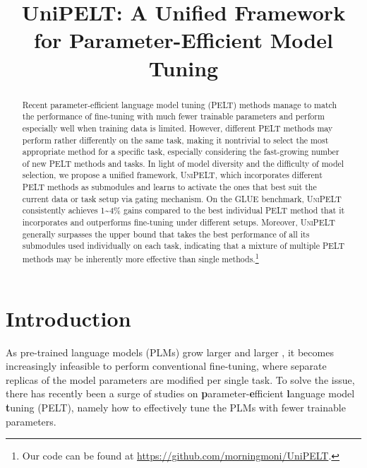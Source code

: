 \title{UniPELT: A Unified Framework for Parameter-Efficient Model Tuning}

\begin{abstract}
Recent parameter-efficient language model tuning (PELT) methods manage to match the performance of fine-tuning with much fewer trainable parameters and perform especially well when training data is limited. However, different PELT methods may perform rather differently on the same task, making it nontrivial to select the most appropriate method for a specific task, especially considering the fast-growing number of new PELT methods and tasks. In light of model diversity and the difficulty of model selection, we propose a unified framework, \textsc{UniPELT}, which incorporates different PELT methods as submodules and learns to activate the ones that best suit the current data or task setup via gating mechanism. On the GLUE benchmark, \textsc{UniPELT} consistently achieves 1\textasciitilde4\% gains compared to the best individual PELT method that it incorporates and outperforms fine-tuning under different setups. Moreover, \textsc{UniPELT} generally surpasses the upper bound that takes the best performance of all its submodules used individually on each task, indicating that a mixture of multiple PELT methods may be inherently more effective than single methods.\footnote{Our code can be found at \url{https://github.com/morningmoni/UniPELT}.}
\end{abstract}

\section{Introduction}
As pre-trained language models (PLMs) \cite{devlin-etal-2019-bert} grow larger and larger \cite{brown2020language}, it becomes increasingly infeasible to perform conventional fine-tuning, where separate replicas of the model parameters are modified per single task. To solve the issue, there has recently been a surge of studies on \textbf{p}arameter-\textbf{e}fficient \textbf{l}anguage model \textbf{t}uning (PELT), namely how to effectively tune the PLMs with fewer trainable parameters.

